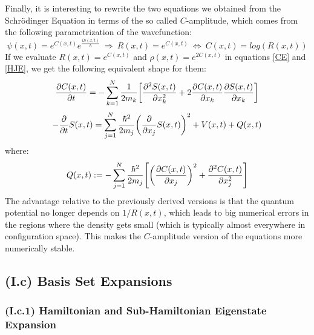 \documentclass[11pt, a4paper]{article} %
\begin{document}
Finally, it is interesting to rewrite the two equations we obtained from the Schrödinger Equation in terms of the so called $C$-amplitude, which comes from the following parametrization of the wavefunction:
\begin{equation}
\psi(x,t)=e^{C(x,t)}e^{\frac{iS(x,t)}{\hbar}}\ \Longrightarrow\ R(x,t)=e^{C(x,t)} \ \Leftrightarrow \ C(x,t)=log(R(x,t))
\end{equation}
If we evaluate $R(x,t)=e^{C(x,t)}$ and $\rho(x,t)=e^{2C(x,t)}$ in equations \eqref{CE} and \eqref{HJE}, we get the following equivalent shape for them:
\begin{equation}\label{CE.C}
\pdv{C(x,t)}{t} = -\sum_{k=1}^N \frac{1}{2m_k}\qty[\pdv[2]{S(x,t)}{x_k}+2\pdv{C(x,t)}{x_k}\pdv{S(x,t)}{x_k}]
\end{equation}
\begin{equation}\label{HJE.C}
-\pdv{}{t}S(x,t) = \sum_{j=1}^N \frac{\hbar^2}{2m_j} \qty(\pdv{}{x_j} S(x,t) )^2+ V(x,t)+Q(x,t)
\end{equation}
where:
\begin{equation}\label{QP.C}
Q(x,t):=-\sum_{j=1}^N \frac{\hbar^2}{2m_j}\qty[\qty(\pdv{C(x,t)}{x_j})^2+\pdv[2]{C(x,t)}{x_j}]
\end{equation}
The advantage relative to the previously derived versions is that the quantum potential no longer depends on $1/R(x,t)$, which leads to big numerical errors in the regions where the density gets small (which is typically almost everywhere in configuration space). This makes the $C$-amplitude version of the equations more numerically stable.

\subsection*{(I.c) Basis Set Expansions}
\vspace{-0.4cm}
\subsubsection*{(I.c.1) Hamiltonian and Sub-Hamiltonian Eigenstate Expansion}
\vspace{-0.25cm}
\end{document}
